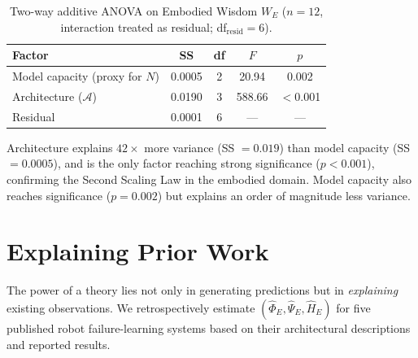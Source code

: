 \documentclass{article}
\newcommand{\cA}{\mathcal{A}}
\begin{document}
\begin{table}[t]
\centering
\caption{Two-way additive ANOVA on Embodied Wisdom $W_E$ ($n = 12$, interaction treated as residual; df$_{\text{resid}} = 6$).}
\label{tab:anova_embodied}
\begin{tabular}{lcccc}
\toprule
\textbf{Factor} & \textbf{SS} & \textbf{df} & $F$ & $p$ \\
\midrule
Model capacity (proxy for $N$) & 0.0005 & 2 & 20.94 & 0.002 \\
Architecture ($\cA$)            & 0.0190 & 3 & 588.66 & $<$0.001 \\
\midrule
Residual                        & 0.0001 & 6 & --- & --- \\
\bottomrule
\end{tabular}
\end{table}

Architecture explains $42\times$ more variance (SS $= 0.019$) than model capacity (SS $= 0.0005$), and is the only factor reaching strong significance ($p < 0.001$), confirming the Second Scaling Law in the embodied domain.
Model capacity also reaches significance ($p = 0.002$) but explains an order of magnitude less variance.

\section{Explaining Prior Work}
\label{sec:explaining}

The power of a theory lies not only in generating predictions but in \emph{explaining} existing observations.
We retrospectively estimate $(\hat{\Phi}_E, \hat{\Psi}_E, \hat{H}_E)$ for five published robot failure-learning systems based on their architectural descriptions and reported results.
\end{document}
